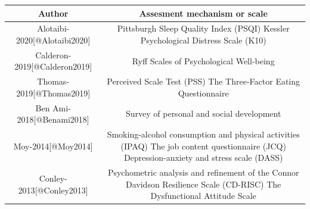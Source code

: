 \documentclass[]{article}
\begin{document}
\begin{longtable}[]{@{}cc@{}}
\toprule
\begin{minipage}[b]{0.22\columnwidth}\centering
\textbf{Author}\strut
\end{minipage} & \begin{minipage}[b]{0.72\columnwidth}\centering
\textbf{Assesment mechanism or scale}\strut
\end{minipage}\tabularnewline
\midrule
\endhead
\begin{minipage}[t]{0.22\columnwidth}\centering
Alotaibi-2020{[}@Alotaibi2020{]}\strut
\end{minipage} & \begin{minipage}[t]{0.72\columnwidth}\centering
Pittsburgh Sleep Quality Index (PSQI) Kessler Psychological Distress
Scale (K10)\strut
\end{minipage}\tabularnewline
\begin{minipage}[t]{0.22\columnwidth}\centering
Calderon-2019{[}@Calderon2019{]}\strut
\end{minipage} & \begin{minipage}[t]{0.72\columnwidth}\centering
Ryff Scales of Psychological Well-being\strut
\end{minipage}\tabularnewline
\begin{minipage}[t]{0.22\columnwidth}\centering
Thomas-2019{[}@Thomas2019{]}\strut
\end{minipage} & \begin{minipage}[t]{0.72\columnwidth}\centering
Perceived Scale Test (PSS) The Three-Factor Eating Questionnaire\strut
\end{minipage}\tabularnewline
\begin{minipage}[t]{0.22\columnwidth}\centering
Ben Ami-2018{[}@Benami2018{]}\strut
\end{minipage} & \begin{minipage}[t]{0.72\columnwidth}\centering
Survey of personal and social development\strut
\end{minipage}\tabularnewline
\begin{minipage}[t]{0.22\columnwidth}\centering
Moy-2014{[}@Moy2014{]}\strut
\end{minipage} & \begin{minipage}[t]{0.72\columnwidth}\centering
Smoking-alcohol consumption and physical activities (IPAQ) The job
content questionnaire (JCQ) Depression-anxiety and stress scale
(DASS)\strut
\end{minipage}\tabularnewline
\begin{minipage}[t]{0.22\columnwidth}\centering
Conley-2013{[}@Conley2013{]}\strut
\end{minipage} & \begin{minipage}[t]{0.72\columnwidth}\centering
Psychometric analysis and refinement of the Connor Davidson Resilience
Scale (CD-RISC) The Dysfunctional Attitude Scale\strut
\end{minipage}\tabularnewline
\bottomrule
\end{longtable}
\end{document}
